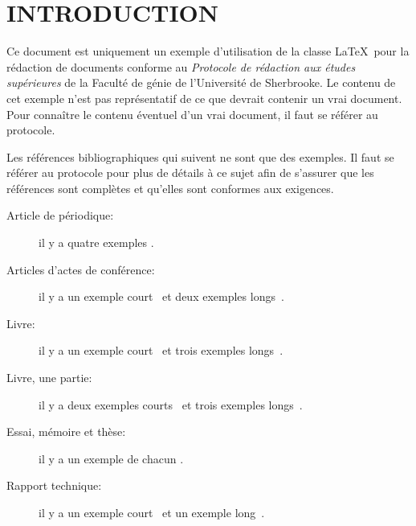 
\chapter{INTRODUCTION}

Ce document est uniquement un exemple d'utilisation de la classe \LaTeX\ pour la rédaction de documents conforme au \textit{Protocole de rédaction aux études supérieures} de la Faculté de génie de l'Université de Sherbrooke.  Le contenu de cet exemple n'est pas représentatif de ce que devrait contenir un vrai document. Pour connaître le contenu éventuel d'un vrai document, il faut se référer au protocole.

Les références bibliographiques qui suivent ne sont que des exemples. Il faut se référer au protocole pour plus de détails à ce sujet afin de s'assurer que les références sont complètes et qu'elles sont conformes aux exigences.

\begin{description}
  \item[Article de périodique:]
       il y a quatre exemples \cite{burke1995,pattamatta2009,roy2009,vasu2009}.

  \item[Articles d'actes de conférence:]
       il y a un exemple court~\cite{prevenslik2009}
       et deux exemples longs~\cite{coronado2005,yeung2006}.

  \item[Livre:]
       il y a un exemple court~\cite{russell2003}
       et trois exemples longs~\cite{kececioglu1991,knuth1998-num,meriam2010}.
          
  \item[Livre, une partie:]
       il y a deux exemples courts~\cite{cormen2001,gaddis2009}
       et trois exemples longs~\cite{kececioglu1991-partie,knuth1998-sort,meriam2010-dist}.
  
  \item[Essai, mémoire et thèse:]
       il y a un exemple de chacun \cite{belanger2009,chafei2009,francoeur2009}.
  
  \item[Rapport technique:]
      il y a un exemple court~\cite{belley2008}
      et un exemple long~\cite{kernighan1991}.
    
\end{description}


